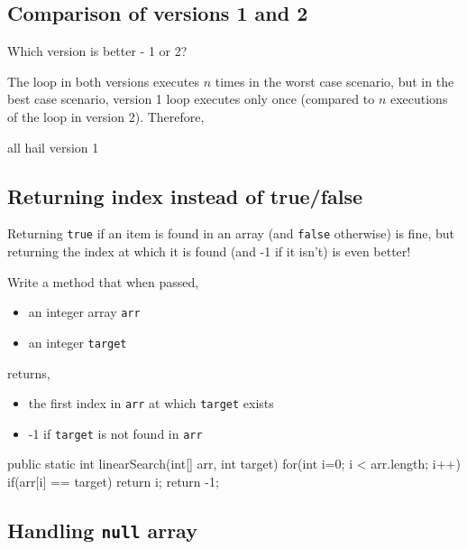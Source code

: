 \subsection{Comparison of versions 1 and 2}
\begin{exercise}
Which version is better - 1 or 2?
\end{exercise}
\begin{answer}
The loop in both versions executes $n$ times in the worst case scenario, but in the best case scenario, version 1 loop executes only once (compared to $n$ executions of the loop in version 2). Therefore, 
\begin{center}
	\huge{all hail version 1}
\end{center}
	
\end{answer}

\subsection{Returning index instead of true/false}

Returning \texttt{true} if an item is found in an array (and \texttt{false} otherwise) is fine, but returning the index at which it is found (and -1 if it isn't) is even better!

\begin{exercise}
Write a method that when passed,

\begin{itemize} 
\item an integer array \texttt{arr}
\item an integer \texttt{target}
\end{itemize}

returns,

\begin{itemize}
\item the first index in \texttt{arr} at which \texttt{target} exists
\item -1 if 	\texttt{target} is not found in \texttt{arr}
\end{itemize}
\end{exercise}
\begin{codeAnswer}
public static int linearSearch(int[] arr, int target) {
	for(int i=0; i < arr.length; i++) {
		if(arr[i] == target) {
			return i;
		}
	}
	return -1;
}
\end{codeAnswer}

\subsection{Handling \texttt{null} array}

